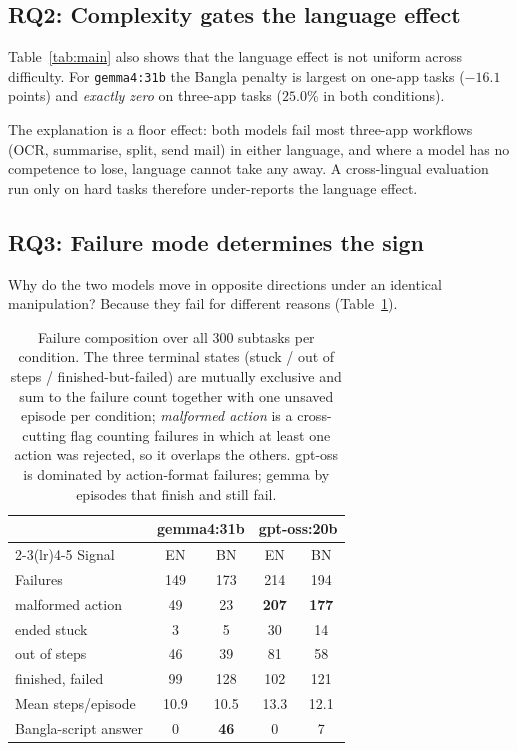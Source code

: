\documentclass[11pt]{article}
\begin{document}
\subsection{RQ2: Complexity gates the language effect}

Table~\ref{tab:main} also shows that the language effect is not uniform across difficulty. For
\texttt{gemma4:31b} the Bangla penalty is largest on one-app tasks ($-16.1$ points) and
\emph{exactly zero} on three-app tasks ($25.0\%$ in both conditions).

The explanation is a floor effect: both models fail most three-app workflows (OCR, summarise,
split, send mail) in either language, and where a model has no competence to lose, language
cannot take any away. A cross-lingual evaluation run only on hard tasks therefore under-reports
the language effect.

\subsection{RQ3: Failure mode determines the sign}

Why do the two models move in opposite directions under an identical manipulation? Because they
fail for different reasons (Table~\ref{tab:modes}).

\begin{table}[t]
\centering\small
\begin{tabular}{lcccc}
\toprule
 & \multicolumn{2}{c}{gemma4:31b} & \multicolumn{2}{c}{gpt-oss:20b} \\
\cmidrule(lr){2-3}\cmidrule(lr){4-5}
Signal & EN & BN & EN & BN \\
\midrule
Failures            & 149 & 173 & 214 & 194 \\
\;\;malformed action & 49 & 23 & \textbf{207} & \textbf{177} \\
\;\;ended stuck      & 3 & 5 & 30 & 14 \\
\;\;out of steps     & 46 & 39 & 81 & 58 \\
\;\;finished, failed & 99 & 128 & 102 & 121 \\
\midrule
Mean steps/episode   & 10.9 & 10.5 & 13.3 & 12.1 \\
Bangla-script answer & 0 & \textbf{46} & 0 & 7 \\
\bottomrule
\end{tabular}
\caption{Failure composition over all 300 subtasks per condition. The three terminal states
(stuck / out of steps / finished-but-failed) are mutually exclusive and sum to the failure count
together with one unsaved episode per condition; \emph{malformed action} is a cross-cutting flag
counting failures in which at least one action was rejected, so it overlaps the others. gpt-oss
is dominated by action-format failures; gemma by episodes that finish and still fail.}
\label{tab:modes}
\end{table}
\end{document}
